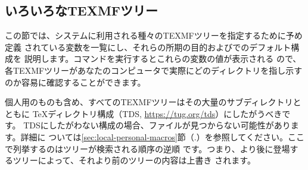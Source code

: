 \documentclass[uplatex,dvipdfmx,12pt,tombow]{jsarticle}
\begin{document}
\subsection{いろいろなTEXMFツリー}
\label{sec:texmftrees}

この節では、システムに利用される種々のTEXMFツリーを指定するために予め定義
されている変数を一覧にし、それらの所期の目的および\TL でのデフォルト構成を
説明します。コマンドを実行するとこれらの変数の値が表示される
ので、各TEXMFツリーがあなたのコンピュータで実際にどのディレクトリを指し示す
のか容易に確認することができます。

個人用のものも含め、すべてのTEXMFツリーはその大量のサブディレクトリとともに
\TeX ディレクトリ構成（TDS, \url{https://tug.org/tds}）にしたがうべきです。
TDSにしたがわない構成の場合、ファイルが見つからない可能性があります。詳細に
ついては\ref{sec:local-personal-macros}節（\p.\pageref{sec:local-personal-%
macros}）を参照してください。ここで列挙するのはツリーが検索される順序の逆順
です。つまり、より後に登場するツリーによって、それより前のツリーの内容は上書き
されます。
%
\end{document}
